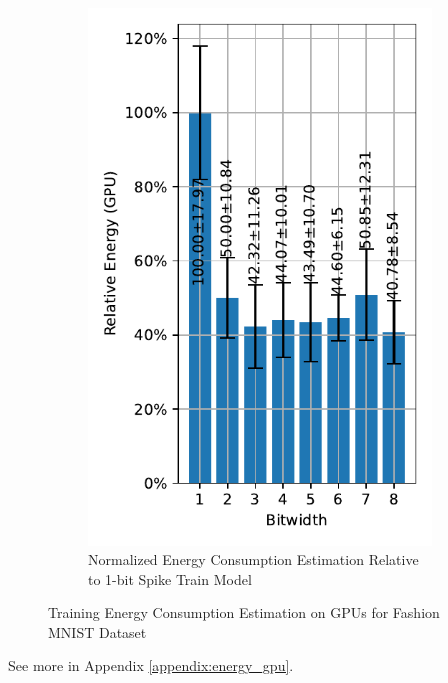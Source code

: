 \begin{figure}[!htpb]
            \hfill
            \begin{subfigure}[H]{0.45\textwidth}
                \includegraphics[width=\textwidth]{../standard/FashionMNIST/plots/fashionmnist_train_relative_energy_gpu.pdf}
                \caption{Normalized Energy Consumption Estimation Relative to 1-bit Spike Train Model}
            \end{subfigure}
            \caption{Training Energy Consumption Estimation on GPUs for Fashion MNIST Dataset}
            \label{fig:training_energy_gpu}
        \end{figure}

        See more in Appendix \ref{appendix:energy_gpu}.

